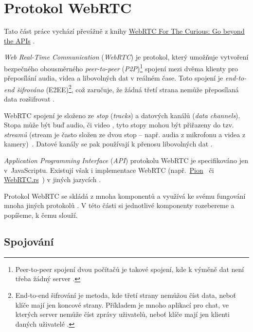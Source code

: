 \section{Protokol WebRTC}\label{webRTC}

Tato část práce vychází převážně z knihy
\href{https://webrtcforthecurious.com/}{WebRTC For The Curious: Go beyond the
    APIs} \cite{WebRTCForTheCurious}.

\textit{Web Real-Time Communication} (\textit{WebRTC}) je protokol, který
umožňuje vytvoření bezpečného obousměrného \textit{peer-to-peer}
(\textit{P2P})\footnote{Peer-to-peer spojení dvou počítačů je takové spojení,
    kde k výměně dat není třeba žádný server \cite{MerriamWebster-PeerToPeer}.}
spojení mezi dvěma klienty pro přeposílání audia, videa a libovolných dat v
reálném čase. Toto spojení je \textit{end-to-end šifrováno}
(E2EE)\footnote{End-to-end šifrování je metoda, kde třetí strany nemůžou číst
    data, neboť klíče mají jen koncové strany. Příkladem je mnoho aplikací pro chat,
    ve kterých server nemůže číst zprávy uživatelů, neboť klíče mají jen klienti
    daných uživatelé \cite{IBM-EndToEndEncryption}.}, což zaručuje, že žádná třetí
strana nemůže přeposílaná data rozšifrovat \cite{WebRTCForTheCurious}.

WebRTC spojení je složeno ze \textit{stop} (\textit{tracks}) a datových kanálů
(\textit{data channels}). Stopa může být buď audio, či video
\cite{MDN-WebRTC-MediaStreamTrack}, tyto stopy mohou být přiřazeny do tzv.
\textit{streamů} (stream je často složen ze dvou stop -- např. audia z mikrofonu
a videa z kamery)~\cite{MDN-WebRTC-MediaStream}. Datové kanály se pak používají
k přenosu libovolných dat \cite{WebRTCORG-GettingStarted-DataChannels}.

\textit{Application Programming Interface} (\textit{API}) protokolu WebRTC je
specifikováno jen v~JavaScriptu. Existují však i implementace WebRTC
(např.~\href{https://github.com/pion/webrtc}{Pion}~\cite{GitHub-Pion-WebRTC} či
\href{https://github.com/webrtc-rs/webrtc}{WebRTC.rs}~\cite{GitHub-WebRTCRS-WebRTC})
v jiných jazycích \cite{WebRTCForTheCurious}.

Protokol WebRTC se skládá z mnoha komponentů a využívá ke svému fungování mnoha
jiných protokolů \cite{WebRTCForTheCurious}. V této části si jednotlivé
komponenty rozebereme a popíšeme, k čemu slouží.

\subsection{Spojování}\label{connecting}

